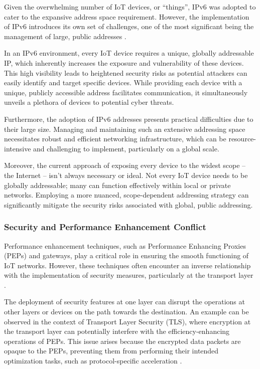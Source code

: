 \documentclass{ieeeaccess}
\begin{document}
Given the overwhelming number of IoT devices, or ``things'', IPv6 was adopted to cater to the expansive address space requirement. However, the implementation of IPv6 introduces its own set of challenges, one of the most significant being the management of large, public addresses \cite{das2023recent}.

In an IPv6 environment, every IoT device requires a unique, globally addressable IP, which inherently increases the exposure and vulnerability of these devices. This high visibility leads to heightened security risks as potential attackers can easily identify and target specific devices. While providing each device with a unique, publicly accessible address facilitates communication, it simultaneously unveils a plethora of devices to potential cyber threats.

Furthermore, the adoption of IPv6 addresses presents practical difficulties due to their large size. Managing and maintaining such an extensive addressing space necessitates robust and efficient networking infrastructure, which can be resource-intensive and challenging to implement, particularly on a global scale.

Moreover, the current approach of exposing every device to the widest scope -- the Internet -- isn't always necessary or ideal. Not every IoT device needs to be globally addressable; many can function effectively within local or private networks. Employing a more nuanced, scope-dependent addressing strategy can significantly mitigate the security risks associated with global, public addressing.
	
\subsubsection{Security and Performance Enhancement Conflict}

Performance enhancement techniques, such as Performance Enhancing Proxies (PEPs) and gateways, play a critical role in ensuring the smooth functioning of IoT networks. However, these techniques often encounter an inverse relationship with the implementation of security measures, particularly at the transport layer \cite{peymanICC16, in-net-res-pool}.

The deployment of security features at one layer can disrupt the operations at other layers or devices on the path towards the destination. An example can be observed in the context of Transport Layer Security (TLS), where encryption at the transport layer can potentially interfere with the efficiency-enhancing operations of PEPs. This issue arises because the encrypted data packets are opaque to the PEPs, preventing them from performing their intended optimization tasks, such as protocol-specific acceleration \cite{7005393}.
	
\end{document}
